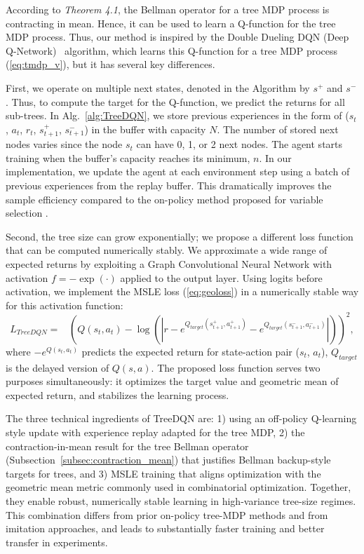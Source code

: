 \documentclass[preprint,12pt]{elsarticle} %
\theoremstyle{plain}
\theoremstyle{definition}
\theoremstyle{remark}
\begin{document}
According to \emph{Theorem 4.1}, the Bellman operator for a tree MDP process is contracting in mean. Hence, it can be used to learn a Q-function for the tree MDP process. Thus, our method is inspired by the Double Dueling DQN (Deep Q-Network)~\cite{Mnih2015} algorithm, which learns this Q-function for a tree MDP process (\ref{eq:tmdp_v}), but it has several key differences. 

First, we operate on multiple next states, denoted in the Algorithm by $s^+$ and $s^-$. Thus, to compute the target for the Q-function, we predict the returns for all sub-trees. In Alg.~\ref{alg:TreeDQN}, we store previous experiences in the form of ($s_t$, $a_t$, $r_t$, $s_{t+1}^+$, $s_{t+1}^-$) in the buffer with capacity $N$. The number of stored next nodes varies since the node $s_t$ can have 0, 1, or 2 next nodes. The agent starts training when the buffer's capacity reaches its minimum, $n$. %
In our implementation, we update the agent at each environment step using a batch of previous experiences from the replay buffer. This dramatically improves the sample efficiency compared to the on-policy method proposed for variable selection \cite{scavuzzo_2022}.

Second, the tree size can grow exponentially; we propose a different loss function that can be computed numerically stably. We approximate a wide range of expected returns by exploiting a Graph Convolutional Neural Network with activation $f = -\exp(\cdot)$ applied to the output layer. Using logits before activation, we implement the MSLE loss (\ref{eq:geoloss}) in a numerically stable way for this activation function:
\begin{equation}
L_{TreeDQN} = \hspace{10pt}\left(Q(s_t, a_t) - \log\left(\left|r - e ^ {Q_{target}(s_{t+1}^+, a_{t+1}^+)} - e^{Q_{target}(s_{t+1}^-, a_{t+1}^-)}\right|\right)\right)^2,
\label{eq:treedqn_loss}
\end{equation}
where $-e^{Q(s_t, a_t)}$ predicts the expected return for state-action pair ($s_t$, $a_t$), $Q_{target}$ is the delayed version of $Q(s, a)$. The proposed loss function serves two purposes simultaneously: it optimizes the target value and geometric mean of expected return, and stabilizes the learning process.

The three technical ingredients of TreeDQN are: 1) using an off-policy Q-learning style update with experience replay adapted for the tree MDP, 2) the contraction-in-mean result for the tree Bellman operator (Subsection~\ref{subsec:contraction_mean}) that justifies Bellman backup-style targets for trees, and 3) MSLE training that aligns optimization with the geometric mean metric commonly used in combinatorial optimization. Together, they enable robust, numerically stable learning in high-variance tree-size regimes. This combination differs from prior on-policy tree-MDP methods and from imitation approaches, and leads to substantially faster training and better transfer in experiments.
\end{document}
